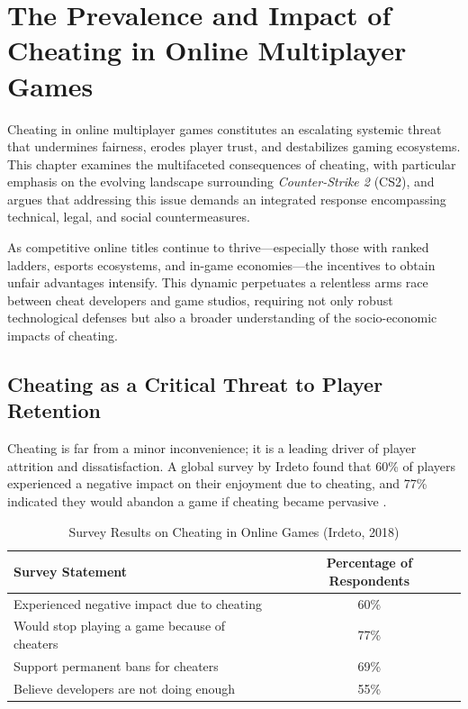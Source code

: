 \chapter{The Prevalence and Impact of Cheating in Online Multiplayer Games}

Cheating in online multiplayer games constitutes an escalating systemic threat that undermines fairness, erodes player trust, and destabilizes gaming ecosystems.  
This chapter examines the multifaceted consequences of cheating, with particular emphasis on the evolving landscape surrounding \textit{Counter-Strike 2} (CS2), and argues that addressing this issue demands an integrated response encompassing technical, legal, and social countermeasures.

As competitive online titles continue to thrive—especially those with ranked ladders, esports ecosystems, and in-game economies—the incentives to obtain unfair advantages intensify.  
This dynamic perpetuates a relentless arms race between cheat developers and game studios, requiring not only robust technological defenses but also a broader understanding of the socio-economic impacts of cheating.

\section{Cheating as a Critical Threat to Player Retention}

Cheating is far from a minor inconvenience; it is a leading driver of player attrition and dissatisfaction.  
A global survey by Irdeto found that 60\% of players experienced a negative impact on their enjoyment due to cheating, and 77\% indicated they would abandon a game if cheating became pervasive \cite{irdeto2018global}.

\begin{table}[H]
  \centering
  \caption{Survey Results on Cheating in Online Games (Irdeto, 2018)}
  \label{tab:irdeto-survey}
  \begin{tabular}{|l|c|}
  \hline
  \textbf{Survey Statement} & \textbf{Percentage of Respondents} \\
  \hline
  Experienced negative impact due to cheating & 60\% \\
  Would stop playing a game because of cheaters & 77\% \\
  Support permanent bans for cheaters & 69\% \\
  Believe developers are not doing enough & 55\% \\
  \hline
  \end{tabular}
\end{table}

